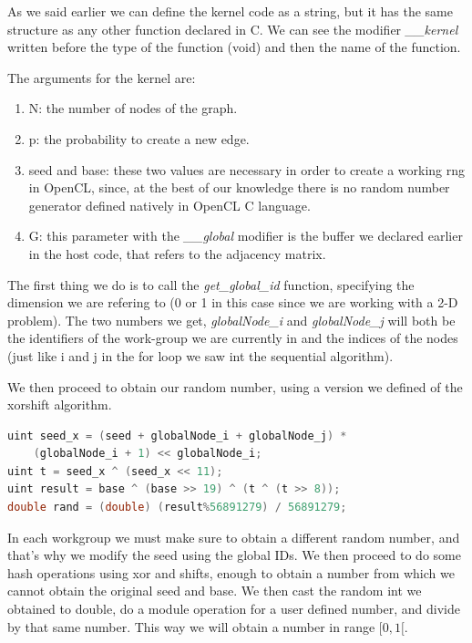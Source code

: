 \documentclass[titlepage]{article}
\begin{document}
As we said earlier we can define the kernel code as a string, but it has the same structure as any other function declared in C. We can see the modifier \textit{\_\_kernel} written before the type of the function (void) and then the name of the function.

The arguments for the kernel are:
\begin{enumerate}
    \item N: the number of nodes of the graph.
    \item p: the probability to create a new edge.
    \item seed and base: these two values are necessary in order to create a working rng in OpenCL, since, at the best of our knowledge there is no random number generator defined natively in OpenCL C language.
    \item G: this parameter with the \textit{\_\_global} modifier is the buffer we declared earlier in the host code, that refers to the adjacency matrix.
\end{enumerate}

The first thing we do is to call the \textit{get\_global\_id} function, specifying the dimension we are refering to (0 or 1 in this case since we are working with a 2-D problem). The two numbers we get, \textit{globalNode\_i} and \textit{globalNode\_j} will both be the identifiers of the work-group we are currently in and the indices of the nodes (just like i and j in the for loop we saw int the sequential algorithm).

We then proceed to obtain our random number, using a version we defined of the xorshift algorithm.

\begin{minipage}{\linewidth}
\begin{lstlisting}[language=C, style=customc, breaklines=true]
uint seed_x = (seed + globalNode_i + globalNode_j) *
    (globalNode_i + 1) << globalNode_i;
uint t = seed_x ^ (seed_x << 11);
uint result = base ^ (base >> 19) ^ (t ^ (t >> 8));
double rand = (double) (result%56891279) / 56891279;
\end{lstlisting}
\end{minipage}

In each workgroup we must make sure to obtain a different random number, and that's why we modify the seed using the global IDs. We then proceed to do some hash operations using xor and shifts, enough to obtain a number from which we cannot obtain the original seed and base. We then cast the random int we obtained to double, do a module operation for a user defined number, and divide by that same number. This way we will obtain a number in range $[0,1[$.
\end{document}
